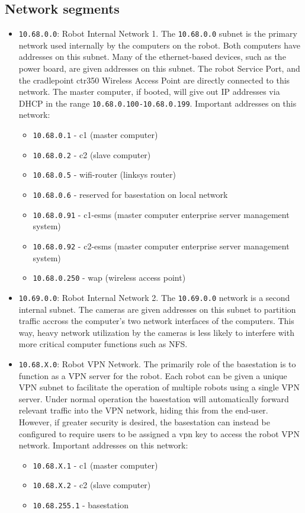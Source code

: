\subsection{Network segments}
\begin{itemize}
\item \texttt{10.68.0.0}: Robot Internal Network 1. The
  \texttt{10.68.0.0} subnet is the primary network used internally by
  the computers on the robot.  Both computers have addresses on this
  subnet.  Many of the ethernet-based devices, such as the power
  board, are given addresses on this subnet.  The robot Service Port,
  and the cradlepoint ctr350 Wireless Access Point are directly
  connected to this network.  The master computer, if booted, will
  give out IP addresses via DHCP in the range
  \texttt{10.68.0.100-10.68.0.199}.  Important addresses on this
  network:
  \begin{itemize}
  \item \texttt{10.68.0.1} - c1 (master computer)
  \item \texttt{10.68.0.2} - c2 (slave computer)
  \item \texttt{10.68.0.5} - wifi-router (linksys router)
  \item \texttt{10.68.0.6} - reserved for basestation on local network
  \item \texttt{10.68.0.91} - c1-esms (master computer enterprise server management system)
  \item \texttt{10.68.0.92} - c2-esms (master computer enterprise server management system)
  \item \texttt{10.68.0.250} - wap (wireless access point)
  \end{itemize}
\item \texttt{10.69.0.0}: Robot Internal Network 2.  The
  \texttt{10.69.0.0} network is a second internal subnet.
  The cameras are given addresses on this subnet to partition traffic
  accross the computer's two network interfaces of the computers. This way, heavy
  network utilization by the cameras is less likely to interfere with
  more critical computer functions such as NFS.
\item \texttt{10.68.X.0}: Robot VPN Network. The primarily role of the
  basestation is to function as a VPN server for the robot.  Each
  robot can be given a unique VPN subnet to facilitate the operation
  of multiple robots using a single VPN server.  Under normal
  operation the basestation will automatically forward relevant
  traffic into the VPN network, hiding this from the end-user.
  However, if greater security is desired, the basestation can instead
  be configured to require users to be assigned a vpn key to access
  the robot VPN network.  Important addresses on this network:
  \begin{itemize}
  \item \texttt{10.68.X.1} - c1 (master computer)
  \item \texttt{10.68.X.2} - c2 (slave computer)
  \item \texttt{10.68.255.1} - basestation
  \end{itemize}
\end{itemize}

